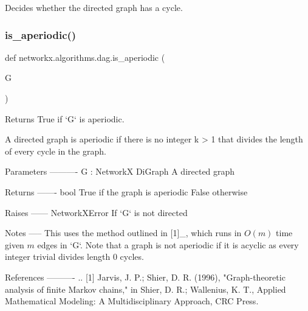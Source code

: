 \begin{DoxyVerb}Decides whether the directed graph has a cycle.\end{DoxyVerb}
 \mbox{\label{namespacenetworkx_1_1algorithms_1_1dag_a4ecc4e0b39707797a07ead610a9ecdf7}} 
\subsubsection{\texorpdfstring{is\+\_\+aperiodic()}{is\_aperiodic()}}
{\footnotesize\ttfamily def networkx.\+algorithms.\+dag.\+is\+\_\+aperiodic (\begin{DoxyParamCaption}\item[{}]{G }\end{DoxyParamCaption})}

\begin{DoxyVerb}Returns True if `G` is aperiodic.

A directed graph is aperiodic if there is no integer k > 1 that
divides the length of every cycle in the graph.

Parameters
----------
G : NetworkX DiGraph
    A directed graph

Returns
-------
bool
    True if the graph is aperiodic False otherwise

Raises
------
NetworkXError
    If `G` is not directed

Notes
-----
This uses the method outlined in [1]_, which runs in $O(m)$ time
given $m$ edges in `G`. Note that a graph is not aperiodic if it is
acyclic as every integer trivial divides length 0 cycles.

References
----------
.. [1] Jarvis, J. P.; Shier, D. R. (1996),
   "Graph-theoretic analysis of finite Markov chains,"
   in Shier, D. R.; Wallenius, K. T., Applied Mathematical Modeling:
   A Multidisciplinary Approach, CRC Press.
\end{DoxyVerb}
 \mbox{\label{namespacenetworkx_1_1algorithms_1_1dag_a282871f30feeb5981563367cb9800007}} 
